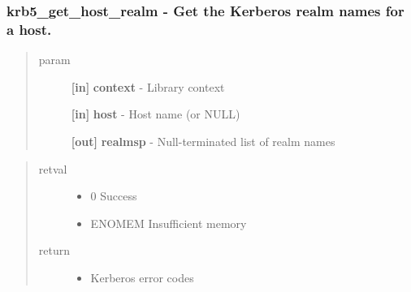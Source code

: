 \documentclass[letterpaper,10pt,english]{sphinxmanual}
\begin{document}
\subsubsection{krb5\_get\_host\_realm -  Get the Kerberos realm names for a host.}
\label{appdev/refs/api/krb5_get_host_realm:krb5-get-host-realm-get-the-kerberos-realm-names-for-a-host}\label{appdev/refs/api/krb5_get_host_realm::doc}

\begin{fulllineitems}
\label{appdev/refs/api/krb5_get_host_realm:c.krb5_get_host_realm}
\end{fulllineitems}

\begin{quote}\begin{description}
\item[{param}] \leavevmode
\textbf{{[}in{]}} \textbf{context} - Library context

\textbf{{[}in{]}} \textbf{host} - Host name (or NULL)

\textbf{{[}out{]}} \textbf{realmsp} - Null-terminated list of realm names

\end{description}\end{quote}
\begin{quote}\begin{description}
\item[{retval}] \leavevmode\begin{itemize}
\item {} 
0   Success

\item {} 
ENOMEM   Insufficient memory

\end{itemize}

\item[{return}] \leavevmode\begin{itemize}
\item {} 
Kerberos error codes

\end{itemize}

\end{description}\end{quote}
\end{document}
